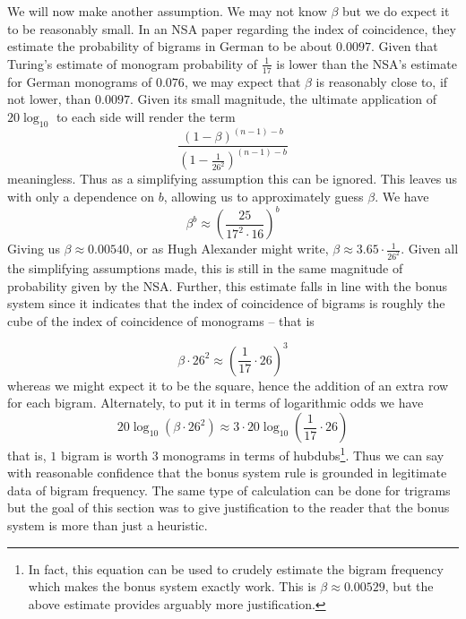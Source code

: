 
  \noindent We will now make another assumption. We may not know
  $\beta$ but we do expect it to be reasonably small. In an NSA paper
  regarding the index of coincidence, they estimate the probability of
  bigrams in German to be about $0.0097$. Given that Turing's
  estimate of monogram probability of $\frac{1}{17}$ is lower than
  the NSA's estimate for German monograms of $0.076$, we may expect
  that $\beta$ is reasonably close to, if not lower, than $0.0097$.
  Given its small magnitude, the ultimate application of
  $20\log_{10}$ to each side will render the term
  \[
    \frac{(1-\beta)^{(n-1)-b}}{(1-\frac{1}{26^2})^{(n-1)-b}}
  \]
  meaningless. Thus as a simplifying assumption this can be ignored.
  This leaves us with only a dependence on $b$, allowing us to
  approximately guess $\beta$. We have
  \[
    \beta^b \approx
    (\frac{25}{17^2\cdot16})^b
  \]
  Giving us $\beta \approx 0.00540$, or as Hugh Alexander might
  write, $\beta \approx 3.65\cdot\frac{1}{26^2}$. Given all the
  simplifying assumptions made, this is still in the same magnitude
  of probability given by the NSA. Further, this estimate falls in
  line with the bonus system since it indicates that the index of
  coincidence of bigrams is roughly the cube of the index of
  coincidence of monograms -- that is

  \[
    \beta\cdot26^2 \approx (\frac{1}{17}\cdot26)^3
  \]
  whereas we might expect it to be the square, hence the addition of
  an extra row for each bigram. Alternately, to put it in terms of
  logarithmic odds we have
  \[
    20\log_{10}(\beta\cdot26^2) \approx 3\cdot20\log_{10}(\frac{1}{17}\cdot26)
  \]
  that is, $1$ bigram is worth $3$ monograms in terms of
  hubdubs\footnote{In fact, this equation can be used to crudely
    estimate the bigram frequency which makes the bonus system exactly
    work. This is $\beta\approx0.00529$, but the above estimate
  provides arguably more justification.}. Thus we can say with reasonable
  confidence that the bonus system rule is grounded in legitimate
  data of bigram frequency. The same type of calculation can be done
  for trigrams but the goal of this section was to give justification
  to the reader that the bonus system is more than just a heuristic.

